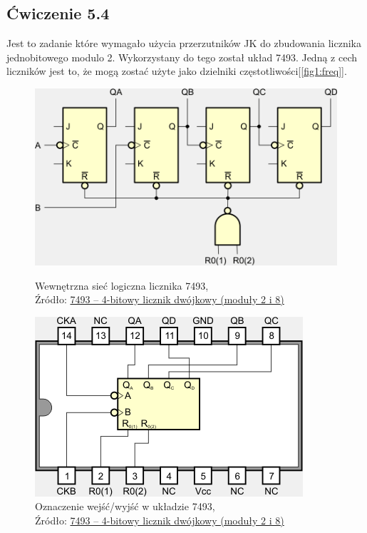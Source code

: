 \documentclass{article}
\begin{document}
    \subsection{Ćwiczenie 5.4}
      Jest to zadanie które wymagało użycia przerzutników JK do zbudowania licznika jednobitowego modulo 2. Wykorzystany do tego został układ 7493. Jedną z cech liczników jest to, że mogą zostać użyte jako dzielniki częstotliwości[\ref{fig1:freq}].

      \begin{figure}[!ht]
        \begin{minipage}{.5\textwidth}
          \centering
          \includegraphics[scale=0.5]{grafiki/7493_01.png}
          \caption{Wewnętrzna sieć logiczna licznika 7493,
          \\Źródło: \href{https://eduinf.waw.pl/inf/prg/010_uc/7493.php}{7493 – 4-bitowy licznik dwójkowy (moduły 2 i 8)}}
        \end{minipage}
        \begin{minipage}{.5\textwidth}
          \centering
          \includegraphics[scale=0.5]{grafiki/7493_03.png}
          \caption{Oznaczenie wejść/wyjść w układzie 7493,
          \\Źródło: \href{https://eduinf.waw.pl/inf/prg/010_uc/7493.php}{7493 – 4-bitowy licznik dwójkowy (moduły 2 i 8)}}
        \end{minipage}
      \end{figure}
\end{document}
